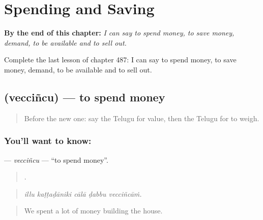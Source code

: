 
\chapter{Spending and Saving}
\label{ch:te-spending-and-saving}

\begin{chapteropening}
\textbf{By the end of this chapter:} \emph{I can say to spend money, to save money, demand, to be available and to sell out.}

Complete the last lesson of chapter 487: I can say to spend money, to save money, demand, to be available and to sell out.
\end{chapteropening}

\section[\texorpdfstring{\te{వెచ్చించు} (vecciñcu)}{వెచ్చించు (vecciñcu)}]{ (vecciñcu) — to spend money}

\label{lesson:TE-C487-veccincu}



\begin{quote}
Before the new one: say the Telugu for value, then the Telugu for to weigh.
\end{quote}

\subsection*{You'll want to know: }
\textbf{} — \emph{vecciñcu} — \textquotedblleft{}to spend money\textquotedblright{}.

\begin{quote}
    .
\end{quote}

\begin{quote}
\emph{illu kaṭṭaḍāniki cālā ḍabbu vecciñcāṁ.}
\end{quote}

\begin{quote}
We spent a lot of money building the house.
\end{quote}

